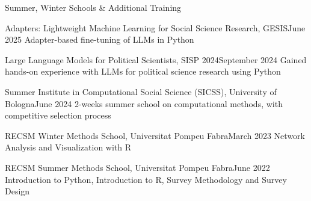 \documentclass{cv} %
\begin{document}

\begin{rSection}{Summer, Winter Schools \& Additional Training}

    \begin{rTrainingSubsection}{Adapters: Lightweight Machine Learning for Social Science Research, GESIS}{June 2025}
    {Adapter-based fine-tuning of LLMs in Python}
    \end{rTrainingSubsection}

    \begin{rTrainingSubsection}{Large Language Models for Political Scientists, SISP 2024}{September 2024}
    {Gained hands-on experience with LLMs for political science research using Python}
    \end{rTrainingSubsection}
    
    \begin{rTrainingSubsection}{Summer Institute in Computational Social Science (SICSS), University of Bologna}{June 2024}
    {2-weeks summer school on computational methods, with competitive selection process}
    \end{rTrainingSubsection}
    
    \begin{rTrainingSubsection}{RECSM Winter Methods School, Universitat Pompeu Fabra}{March 2023}
    {Network Analysis and Visualization with R}
    \end{rTrainingSubsection}
    
    \begin{rTrainingSubsection}{RECSM Summer Methods School, Universitat Pompeu Fabra}{June 2022}
    {Introduction to Python, Introduction to R, Survey Methodology and Survey Design} 
    \end{rTrainingSubsection}
    
\end{rSection}
     
\end{document}
